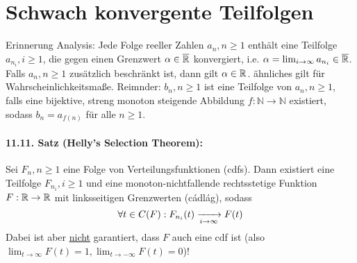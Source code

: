 \documentclass[11pt]{report}
\begin{document}
\section*{Schwach konvergente Teilfolgen}
Erinnerung Analysis: Jede Folge reeller Zahlen $a_n,n\geq1$ enth\"alt eine Teilfolge $a_{n_i},i\geq1$, die gegen einen Grenzwert $\alpha\in\overline{\mathbb{R}}$ konvergiert, i.e. $\alpha=\lim_{i\to\infty}a_{n_i}\in\overline{\mathbb{R}}$. Falls $a_n,n\geq1$ zus\"atzlich beschr\"ankt ist, dann gilt $\alpha\in\mathbb{R}$. \"ahnliches gilt f\"ur Wahrscheinlichkeitsma\ss{}e. \newline
Reimnder: $b_n,n\geq1$ ist eine Teilfolge von $a_n,n\geq1$, falls eine bijektive, streng monoton steigende Abbildung $f:\mathbb{N}\to\mathbb{N}$ existiert, sodass $b_n=a_{f(n)}$ f\"ur alle $n\geq1$.

\paragraph{11.11. Satz (Helly's Selection Theorem):} Sei $F_n,n\geq1$ eine Folge von Verteilungsfunktionen (cdfs). Dann existiert eine Teilfolge $F_{n_i},i\geq1$ und eine monoton-nichtfallende rechtsstetige Funktion $F:\mathbb{R}\to\mathbb{R}$ mit linksseitigen Grenzwerten (cádlág), sodass 
$$\forall t\in C(F):F_{n_i}(t)\nto{}{i\to\infty}F(t)$$
Dabei ist aber \underline{nicht} garantiert, dass $F$ auch eine cdf ist (also $\displaystyle\lim_{t\to\infty}F(t)=1, \lim_{t\to-\infty}F(t)=0$)!
\end{document}
